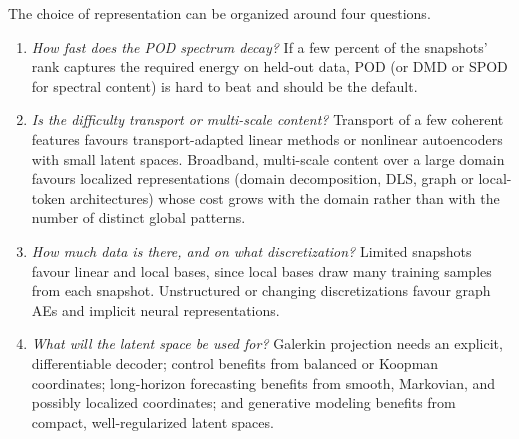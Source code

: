 The choice of representation can be organized around four questions.
\begin{enumerate}[leftmargin=2em,itemsep=2pt]
  \item \emph{How fast does the POD spectrum decay?} If a few percent of the
  snapshots' rank captures the required energy on held-out data, POD (or DMD
  or SPOD for spectral content) is hard to beat and should be the default.
  \item \emph{Is the difficulty transport or multi-scale content?} Transport of a
  few coherent features favours transport-adapted linear methods or nonlinear
  autoencoders with small latent spaces. Broadband, multi-scale content over a
  large domain favours localized representations (domain decomposition, DLS,
  graph or local-token architectures) whose cost grows with the domain rather
  than with the number of distinct global patterns.
  \item \emph{How much data is there, and on what discretization?} Limited
  snapshots favour linear and local bases, since local bases draw many
  training samples from each snapshot. Unstructured or changing
  discretizations favour graph AEs and implicit neural representations.
  \item \emph{What will the latent space be used for?} Galerkin projection
  needs an explicit, differentiable decoder; control benefits from balanced or
  Koopman coordinates; long-horizon forecasting benefits from smooth,
  Markovian, and possibly localized coordinates; and generative modeling
  benefits from compact, well-regularized latent spaces.
\end{enumerate}
